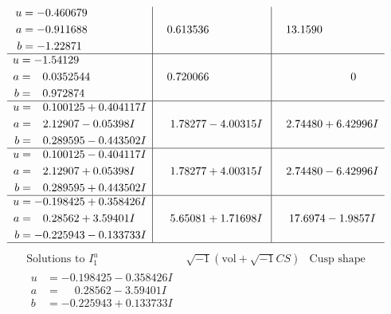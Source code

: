 \documentclass[1p]{elsarticle_modified}
\theoremstyle{definition}
\newcommand{\I}{\sqrt{-1}}
\begin{document}
$$\begin{array}{c|c|c}
\begin{aligned}
u &= -0.460679\phantom{ +0.000000I} \\
a &= -0.911688\phantom{ +0.000000I} \\
b &= -1.22871\phantom{ +0.000000I}\end{aligned}
 & \phantom{-}0.613536\phantom{ +0.000000I} & \phantom{-}13.1590\phantom{ +0.000000I} \\ \hline\begin{aligned}
u &= -1.54129\phantom{ +0.000000I} \\
a &= \phantom{-}0.0352544\phantom{ +0.000000I} \\
b &= \phantom{-}0.972874\phantom{ +0.000000I}\end{aligned}
 & \phantom{-}0.720066\phantom{ +0.000000I} & \phantom{-0.000000 } 0 \\ \hline\begin{aligned}
u &= \phantom{-}0.100125 + 0.404117 I \\
a &= \phantom{-}2.12907 - 0.05398 I \\
b &= \phantom{-}0.289595 - 0.443502 I\end{aligned}
 & \phantom{-}1.78277 - 4.00315 I & \phantom{-}2.74480 + 6.42996 I \\ \hline\begin{aligned}
u &= \phantom{-}0.100125 - 0.404117 I \\
a &= \phantom{-}2.12907 + 0.05398 I \\
b &= \phantom{-}0.289595 + 0.443502 I\end{aligned}
 & \phantom{-}1.78277 + 4.00315 I & \phantom{-}2.74480 - 6.42996 I \\ \hline\begin{aligned}
u &= -0.198425 + 0.358426 I \\
a &= \phantom{-}0.28562 + 3.59401 I \\
b &= -0.225943 - 0.133733 I\end{aligned}
 & \phantom{-}5.65081 + 1.71698 I & \phantom{-}17.6974 - 1.9857 I\\
 \hline 
 \end{array}$$\newpage$$\begin{array}{c|c|c}  
\text{Solutions to }I^u_{1}& \I (\text{vol} + \sqrt{-1}CS) & \text{Cusp shape}\\
 \hline 
\begin{aligned}
u &= -0.198425 - 0.358426 I \\
a &= \phantom{-}0.28562 - 3.59401 I \\
b &= -0.225943 + 0.133733 I\end{aligned}

\end{array}$$
\end{document}
